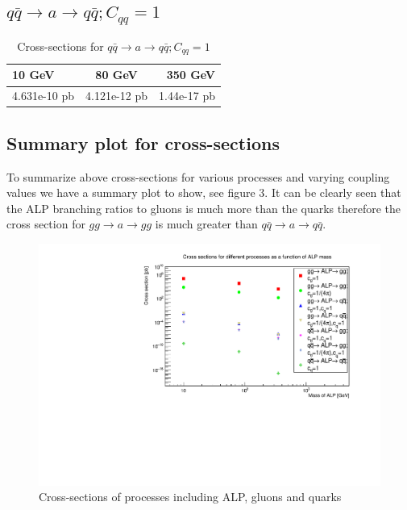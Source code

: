 \documentclass[12pt,a4paper]{article}
\begin{document}
\subsection{$ q \bar{q} \rightarrow a \rightarrow q \bar{q} ; C_{qq} = 1$}

\begin{table}[h!]
\begin{center}
\label{tab : table17}
\begin{tabular}{l|c|r}
\hline
\textbf{10 GeV} & \textbf{80 GeV} & \textbf{350 GeV}\\
\hline
4.631e-10 pb & 4.121e-12 pb  & 1.44e-17 pb  \\
\hline
\end{tabular}
\caption{Cross-sections for $ q \bar{q} \rightarrow a \rightarrow q \bar{q} ; C_{qq} = 1$ }
\end{center}
\end{table}

\subsection{Summary plot for cross-sections}
To summarize above cross-sections for various processes and varying coupling values we have a summary plot to show, see figure 3. It can be clearly seen that the ALP branching ratios to gluons is much more than the quarks therefore the cross section for $gg \rightarrow a \rightarrow gg$ is much greater than $q\bar{q} \rightarrow a \rightarrow q\bar{q}$.

\begin{figure}[h!]
\includegraphics[scale=0.7]{CrossSectionSummaryPlot.pdf}
\caption{Cross-sections of processes including ALP, gluons and quarks}
\label{fig: figure3}
\end{figure}
\pagebreak
\end{document}
